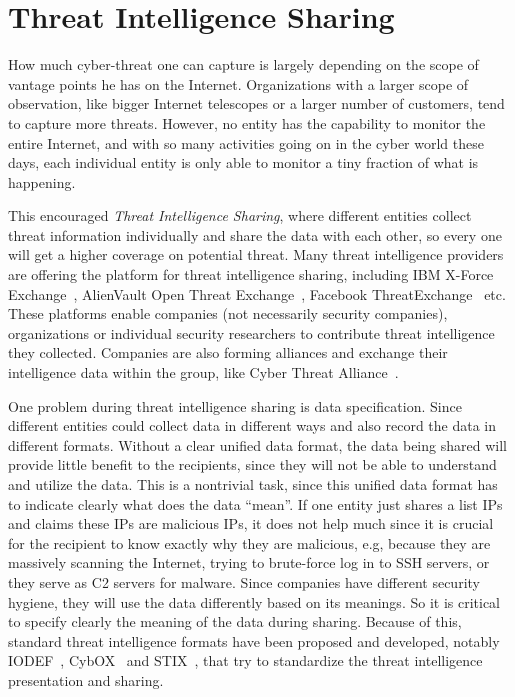 





\section{Threat Intelligence Sharing}
\label{sec:threat_intel_sharing}

How much cyber-threat one can capture is largely depending on the scope of
vantage points he has on the Internet. Organizations with a larger scope of 
observation,
like bigger Internet telescopes or a larger number of customers, tend to
capture more threats. However, no entity has the capability to monitor
the entire Internet, and with so many activities going on in the cyber
world these days, each individual entity is only able to monitor a
tiny fraction of what is happening. 

This encouraged \textit{Threat Intelligence Sharing}, where different 
entities collect threat information individually and share the data
with each other, so every one will get a higher coverage on potential 
threat. Many threat intelligence providers are offering the platform
for threat intelligence sharing, including IBM X-Force 
Exchange~\cite{ibmxforce}, AlienVault Open Threat 
Exchange~\cite{alienvaultotx}, Facebook 
ThreatExchange~\cite{facebookthreatexchange} etc. These platforms
enable companies (not necessarily security companies), organizations 
or individual security researchers to contribute threat intelligence 
they collected. Companies are also forming alliances and exchange their
intelligence data within the group, like Cyber Threat
Alliance~\cite{cyberthreatalliance}.

One problem during threat intelligence sharing is data specification.
Since different entities could collect data in different ways and
also record the data in different formats. Without a clear unified
data format, the data being shared will provide little benefit to
the recipients, since they will not be able to understand and utilize
the data. This is a nontrivial task, since this unified data format
has to indicate clearly what does the data ``mean''. If one entity
just shares a list IPs and claims these IPs are malicious IPs, it
does not help much since it is crucial for the recipient to know
exactly why they are malicious, e.g, because they are massively 
scanning the Internet, trying to brute-force log in to SSH servers,
or they serve as C2 servers for malware. Since companies have different 
security hygiene, they will use the data differently based on its
meanings. So it is critical to specify clearly the meaning of the
data during sharing. Because of this, standard threat intelligence 
formats have been proposed and developed, 
notably IODEF~\cite{IODEF}, CybOX~\cite{CybOX} and STIX~\cite{STIX}, 
that try to standardize the threat intelligence presentation and sharing. 



